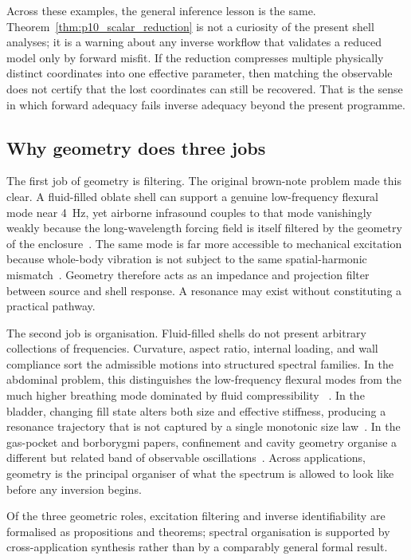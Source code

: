 Across these examples, the general inference lesson is the same.
Theorem~\ref{thm:p10_scalar_reduction} is not a curiosity of the present shell
analyses; it is a warning about any inverse workflow that validates a reduced
model only by forward misfit.  If the reduction compresses multiple physically
distinct coordinates into one effective parameter, then matching the observable
does not certify that the lost coordinates can still be recovered.  That is the
sense in which forward adequacy fails inverse adequacy beyond the present
programme.

\subsection{Why geometry does three jobs}

The first job of geometry is filtering.  The original brown-note problem made
this clear.  A fluid-filled oblate shell can support a genuine low-frequency
flexural mode near \SI{4}{\hertz}, yet airborne infrasound couples to that mode
vanishingly weakly because the long-wavelength forcing field is itself filtered
by the geometry of the enclosure~\cite{BrowntoneP1}.  The same mode is far more
accessible to mechanical excitation because whole-body vibration is not subject
to the same spatial-harmonic mismatch~\cite{BrowntoneP6}.  Geometry therefore
acts as an impedance and projection filter between source and shell response.  A
resonance may exist without constituting a practical pathway.

The second job is organisation.  Fluid-filled shells do not present arbitrary
collections of frequencies.  Curvature, aspect ratio, internal loading, and wall
compliance sort the admissible motions into structured spectral families.  In
the abdominal problem, this distinguishes the low-frequency flexural modes from
the much higher breathing mode dominated by fluid compressibility
~\cite{BrowntoneP1}.  In the bladder, changing fill state alters both size and
effective stiffness, producing a resonance trajectory that is not captured by a
single monotonic size law~\cite{BrowntoneP4}.  In the gas-pocket and
borborygmi papers, confinement and cavity geometry organise a different but
related band of observable oscillations~\cite{BrowntoneP2,BrowntoneP5}.  Across
applications, geometry is the principal organiser of what the spectrum is allowed to
look like before any inversion begins.

Of the three geometric roles, excitation filtering and inverse identifiability
are formalised as propositions and theorems; spectral organisation is supported
by cross-application synthesis rather than by a comparably general formal
result.

